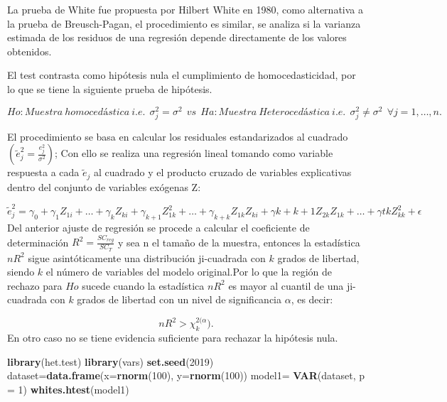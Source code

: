 \documentclass[a4paper,oneside,openany]{book}
\newenvironment{Shaded}{\begin{snugshade}}{\end{snugshade}}
\newcommand{\KeywordTok}[1]{\textcolor[rgb]{0.13,0.29,0.53}{\textbf{#1}}}
\newcommand{\DataTypeTok}[1]{\textcolor[rgb]{0.13,0.29,0.53}{#1}}
\newcommand{\DecValTok}[1]{\textcolor[rgb]{0.00,0.00,0.81}{#1}}
\newcommand{\StringTok}[1]{\textcolor[rgb]{0.31,0.60,0.02}{#1}}
\newcommand{\NormalTok}[1]{#1}
\begin{document}
La prueba de White fue propuesta por Hilbert White en 1980, como
alternativa a la prueba de Breusch-Pagan, el procedimiento es similar,
se analiza si la varianza estimada de los residuos de una regresión
depende directamente de los valores obtenidos.

El test contrasta como hipótesis nula el cumplimiento de
homocedasticidad, por lo que se tiene la siguiente prueba de hipótesis.

\[Ho: Muestra \  homocedástica \ i.e.\ \  \sigma^2_{j}=\sigma^2 \ \ vs \ \
Ha: Muestra \ Heterocedástica \ i.e. \ \ \sigma^2_{j} \neq \sigma^2  \ \ \forall j = 1,\ldots,n.\]

El procedimiento se basa en calcular los residuales estandarizados al
cuadrado \(\left( \tilde{e}^2_{j}=\frac{e^2_{j}}{\sigma^2}\right)\); Con
ello se realiza una regresión lineal tomando como variable respuesta a
cada \(\tilde{e}_{j}\) al cuadrado y el producto cruzado de variables
explicativas dentro del conjunto de variables exógenas Z:

\[\tilde{e}_{j}^{2}=\gamma_{0}+\gamma_{1}Z_{1i}+ \ldots + \gamma_{k}Z_{ki}+\gamma_{k+1}Z^2_{1k}+\ldots + \gamma_{k+k}Z_{1k}Z_{ki}+\gamma{k+k+1}Z_{2k}Z_{1k}+\ldots + \gamma{tk}Z^2_{kk}+\epsilon\]
Del anterior ajuste de regresión se procede a calcular el coeficiente de
determinación \(R^2=\frac{SC_{reg}}{SC_{T}}\) y sea n el tamaño de la
muestra, entonces la estadística \(nR^2\) sigue asintóticamente una
distribución ji-cuadrada con \(k\) grados de libertad, siendo \(k\) el
número de variables del modelo original.Por lo que la región de rechazo
para \(Ho\) sucede cuando la estadística \(nR^2\) es mayor al cuantil de
una ji-cuadrada con \(k\) grados de libertad con un nivel de
significancia \(\alpha\), es decir:

\[nR^2>\chi^{2(\alpha}_{k}).\] En otro caso no se tiene evidencia
suficiente para rechazar la hipótesis nula.

\begin{Shaded}
\begin{Highlighting}[]
\KeywordTok{library}\NormalTok{(het.test)}
\KeywordTok{library}\NormalTok{(vars) }
\KeywordTok{set.seed}\NormalTok{(}\DecValTok{2019}\NormalTok{)}
\NormalTok{dataset=}\KeywordTok{data.frame}\NormalTok{(}\DataTypeTok{x=}\KeywordTok{rnorm}\NormalTok{(}\DecValTok{100}\NormalTok{), }\DataTypeTok{y=}\KeywordTok{rnorm}\NormalTok{(}\DecValTok{100}\NormalTok{)) }
\NormalTok{model1=}\StringTok{ }\KeywordTok{VAR}\NormalTok{(dataset, }\DataTypeTok{p =} \DecValTok{1}\NormalTok{) }
\KeywordTok{whites.htest}\NormalTok{(model1)}
\end{Highlighting}
\end{Shaded}
\end{document}
